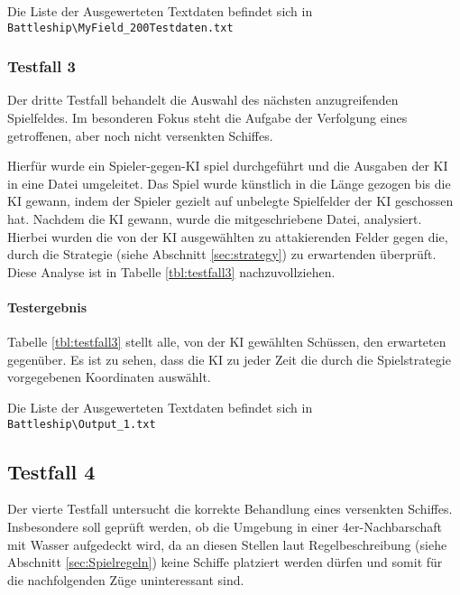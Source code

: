 		Die Liste der Ausgewerteten Textdaten befindet sich in \newline \texttt{Battleship\textbackslash MyField\_200Testdaten.txt}
	\subsubsection{Testfall 3} %
	\label{ssub:testfall_3}
	
	Der dritte Testfall behandelt die Auswahl des nächsten anzugreifenden Spielfeldes. Im besonderen Fokus steht die Aufgabe der Verfolgung eines 
	getroffenen, aber noch nicht versenkten Schiffes.
	
	Hierfür wurde ein Spieler-gegen-KI spiel durchgeführt und die Ausgaben der KI in eine Datei umgeleitet. Das Spiel wurde künstlich in die Länge 
	gezogen bis die KI gewann, indem der Spieler gezielt auf unbelegte Spielfelder der KI geschossen hat.
	Nachdem die KI gewann, wurde die mitgeschriebene Datei, analysiert. Hierbei wurden die von der KI ausgewählten zu attakierenden Felder gegen die,
	durch die Strategie (siehe Abschnitt \ref{sec:strategy}) zu erwartenden überprüft. Diese Analyse ist in Tabelle \ref{tbl:testfall3} nachzuvollziehen.
	
	
	\paragraph{Testergebnis} %
	\label{par:testergebnis}
	 Tabelle \ref{tbl:testfall3} stellt alle, von der KI gewählten Schüssen, den erwarteten gegenüber. Es ist zu sehen, dass die KI zu jeder Zeit 
	die durch die Spielstrategie vorgegebenen Koordinaten auswählt.
	
	Die Liste der Ausgewerteten Textdaten befindet sich in \newline \texttt{Battleship\textbackslash Output\_1.txt}
	\subsection{Testfall 4} %
	\label{sub:testfall_4}
		Der vierte Testfall untersucht die korrekte Behandlung eines versenkten Schiffes. Insbesondere soll geprüft werden, ob die Umgebung in 
		einer 4er-Nachbarschaft
		mit Wasser aufgedeckt wird, da an diesen Stellen laut Regelbeschreibung (siehe Abschnitt \ref{sec:Spielregeln}) keine Schiffe platziert werden dürfen 
		und somit für die nachfolgenden Züge uninteressant sind.
		
